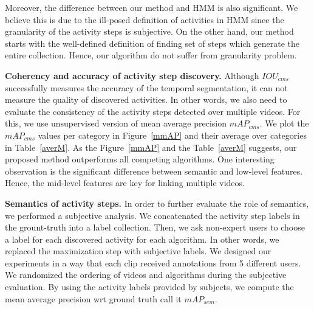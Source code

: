 Moreover, the difference between our method and HMM is also significant. We believe this is due to the ill-posed definition of activities in HMM since the granularity of the activity steps is subjective. On the other hand, our method starts with the well-defined definition of finding set of steps which generate the entire collection. Hence, our algorithm do not suffer from granularity problem.
\begin{table}
\caption{Average of $IOU_{cms}$ and $mAP_{cms}$ over recipes.}
{\small
{}}
\normalsize
\label{averM}
\vspace{-5mm}
\end{table}

\vspace{1mm}
\noindent\textbf{Coherency and accuracy of activity step discovery.}
Although $IOU_{cms}$ successfully measures the accuracy of the temporal segmentation, it can not measure the quality of discovered activities. In other words, we also need to evaluate the consistency of the activity steps detected over multiple videos. For this, we use unsupervised version of mean average precision $mAP_{cms}$. We plot the $mAP_{cms}$ values per category in Figure~\ref{mmAP} and their average over categories in Table~\ref{averM}. As the Figure~\ref{mmAP} and the Table~\ref{averM} suggests, our proposed method outperforms all competing algorithms. One interesting observation is the significant difference between semantic and low-level features. Hence, the mid-level features are key for linking multiple videos.

\vspace{1mm}
\noindent\textbf{Semantics of activity steps.}
In order to further evaluate the role of semantics, we performed a subjective analysis. We concatenated the activity step labels in the grount-truth into a label collection. Then, we ask non-expert users to choose a label for each discovered activity for each algorithm. In other words, we replaced the maximization step with subjective labels. We designed our experiments in a way that each clip received annotations from 5 different users. We randomized the ordering of videos and algorithms during the subjective evaluation. By using the activity labels provided by subjects, we compute the mean average precision wrt ground truth call it $mAP_{sem}$.

